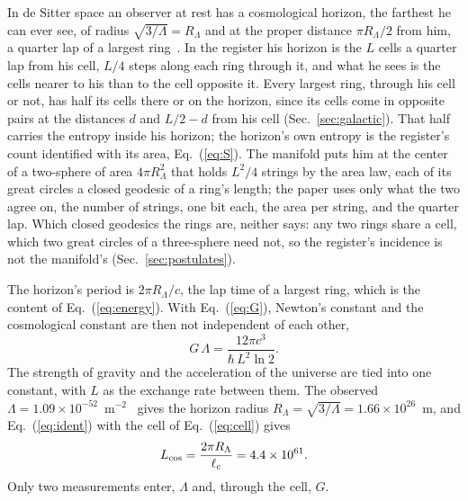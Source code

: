 \documentclass[aps,prd,twocolumn,superscriptaddress,nofootinbib,showkeys]{revtex4-2}
\newcommand{\lc}{\ell_c}
\newcommand{\RL}{R_\Lambda}
\begin{document}
In de Sitter space an observer at rest has a cosmological horizon, the farthest he can ever see, of radius $\sqrt{3/\Lambda} = \RL$ and at the proper distance $\pi\RL/2$ from him, a quarter lap of a largest ring~\cite{gibbons1977}. In the register his horizon is the $L$ cells a quarter lap from his cell, $L/4$ steps along each ring through it, and what he sees is the cells nearer to his than to the cell opposite it. Every largest ring, through his cell or not, has half its cells there or on the horizon, since its cells come in opposite pairs at the distances $d$ and $L/2 - d$ from his cell (Sec.~\ref{sec:galactic}). That half carries the entropy inside his horizon; the horizon's own entropy is the register's count identified with its area, Eq.~(\ref{eq:S}). The manifold puts him at the center of a two-sphere of area $4\pi\RL^2$ that holds $L^2/4$ strings by the area law, each of its great circles a closed geodesic of a ring's length; the paper uses only what the two agree on, the number of strings, one bit each, the area per string, and the quarter lap. Which closed geodesics the rings are, neither says: any two rings share a cell, which two great circles of a three-sphere need not, so the register's incidence is not the manifold's (Sec.~\ref{sec:postulates}).

The horizon's period is $2\pi\RL/c$, the lap time of a largest ring, which is the content of Eq.~(\ref{eq:energy}). With Eq.~(\ref{eq:G}), Newton's constant and the cosmological constant are then not independent of each other,
\begin{equation}
G\,\Lambda = \frac{12\pi c^3}{\hbar\,L^2\ln2}.
\label{eq:Lambda}
\end{equation}
The strength of gravity and the acceleration of the universe are tied into one constant, with $L$ as the exchange rate between them. The observed $\Lambda = 1.09\times10^{-52}$~m$^{-2}$~\cite{planck2018} gives the horizon radius $\RL = \sqrt{3/\Lambda} = 1.66\times10^{26}$~m, and Eq.~(\ref{eq:ident}) with the cell of Eq.~(\ref{eq:cell}) gives
\begin{equation}
L_{\rm cos} = \frac{2\pi\RL}{\lc} = 4.4\times10^{61}.
\label{eq:Lcos}
\end{equation}
Only two measurements enter, $\Lambda$ and, through the cell, $G$.
\end{document}
